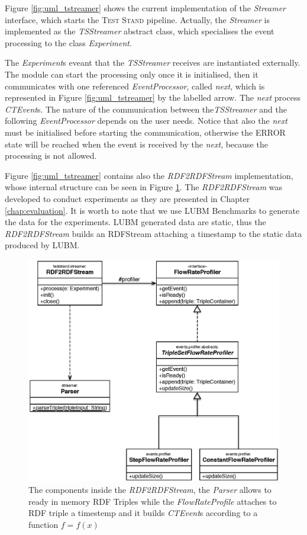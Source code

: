 \noindent Figure \ref{fig:uml_tstreamer} shows the current implementation of the \textit{Streamer} interface, which starts the \textsc{Test Stand} pipeline. Actually, the \textit{Streamer} is implemented as the \textit{TSStreamer} abstract class, which specialises the event processing to the class \textit{Experiment}. 

The \textit{Experiment}s eveant that the \textit{TSStreamer} receives are instantiated externally. The module can start the processing only once it is initialised, then it communicates with one referenced \textit{EventProcessor}, called \textit{next}, which is represented in Figure \ref{fig:uml_tstreamer} by the labelled arrow. The \textit{next} process \textit{CTEvent}s. The nature of the communication between the\textit{TSStreamer} and the following \textit{EventProcessor} depends on the user needs. Notice that also the \textit{next} must be initialised before starting the communication, otherwise the ERROR state will be reached when the event is received by the \textit{next}, because the processing is not allowed.

Figure \ref{fig:uml_tstreamer} contains also the \textit{RDF2RDFStream} implementation, whose internal structure can be seen in Figure \ref{fig:uml_flowrateprofiler}. The \textit{RDF2RDFStream} was developed to conduct experiments as they are presented in Chapter \ref{chap:evaluation}.  It is worth to note that we use LUBM Benchmarks to generate the data for the experiments. LUBM generated data are static, thus the \textit{RDF2RDFStream} builds an RDFStream attaching a timestamp to the static data produced by LUBM. %

\begin{figure}[tbh]
  \centering
	\includegraphics[width=0.75\linewidth]{images/uml_flowrateprofiler}
	\caption[UML Schema: Internal Components of \textit{RDF2RDFStream}]{The components inside the \textit{RDF2RDFStream}, the \textit{Parser} allows to ready in memory RDF Triples while the \textit{FlowRateProfile} attaches to RDF triple a timestemp and it builds \textit{CTEvent}s according to a function $f=f(x)$} 
  	\label{fig:uml_flowrateprofiler}
\end{figure}


